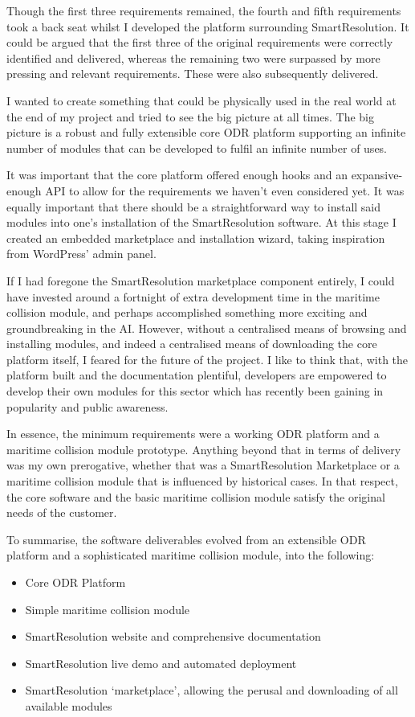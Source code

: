 Though the first three requirements remained, the fourth and fifth requirements took a back seat whilst I developed the platform surrounding SmartResolution. It could be argued that the first three of the original requirements were correctly identified and delivered, whereas the remaining two were surpassed by more pressing and relevant requirements. These were also subsequently delivered.

I wanted to create something that could be physically used in the real world at the end of my project and tried to see the big picture at all times. The big picture is a robust and fully extensible core ODR platform supporting an infinite number of modules that can be developed to fulfil an infinite number of uses.

It was important that the core platform offered enough hooks and an expansive-enough API to allow for the requirements we haven't even considered yet. It was equally important that there should be a straightforward way to install said modules into one's installation of the SmartResolution software. At this stage I created an embedded marketplace and installation wizard, taking inspiration from WordPress' admin panel.

If I had foregone the SmartResolution marketplace component entirely, I could have invested around a fortnight of extra development time in the maritime collision module, and perhaps accomplished something more exciting and groundbreaking in the AI. However, without a centralised means of browsing and installing modules, and indeed a centralised means of downloading the core platform itself, I feared for the future of the project. I like to think that, with the platform built and the documentation plentiful, developers are empowered to develop their own modules for this sector which has recently been gaining in popularity and public awareness.

In essence, the minimum requirements were a working ODR platform and a maritime collision module prototype. Anything beyond that in terms of delivery was my own prerogative, whether that was a SmartResolution Marketplace or a maritime collision module that is influenced by historical cases. In that respect, the core software and the basic maritime collision module satisfy the original needs of the customer.

To summarise, the software deliverables evolved from an extensible ODR platform and a sophisticated maritime collision module, into the following:

\begin{itemize}
\item Core ODR Platform
\item Simple maritime collision module
\item SmartResolution website and comprehensive documentation
\item SmartResolution live demo and automated deployment
\item SmartResolution `marketplace', allowing the perusal and downloading of all available modules
\end{itemize}

